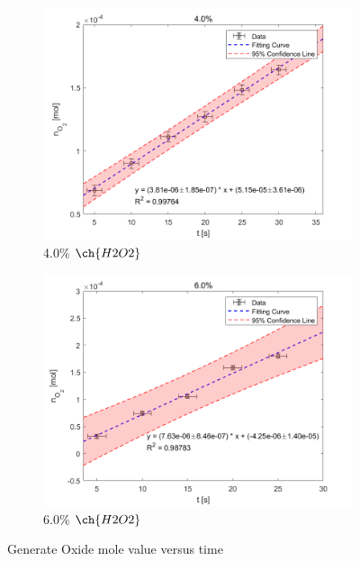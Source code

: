 \documentclass[%
 reprint,
 amsmath,amssymb,
 aps,
]{revtex4-2}
\begin{document}
\begin{figure}[htbp]
	\begin{subfigure}{0.4\textwidth}
		\includegraphics[width = 1\linewidth]{MOL_40.png}%
		\caption{\label{fig:MOL_40}4.0\% $\ch{H2O2}$}
	\end{subfigure}
	\begin{subfigure}{0.4\textwidth}
		\includegraphics[width = 1\linewidth]{MOL_60.png}%
		\caption{\label{fig:MOL_60}6.0\% $\ch{H2O2}$}
	\end{subfigure}
	\caption{\label{fig:v_t}Generate Oxide mole value versus time}
\end{figure}
\end{document}
